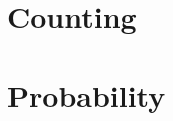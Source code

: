\documentclass{mcs}
\begin{document}
\part{Counting}




\part{Probability}





\iffalse

 (chernoff) %

equivalence relation section in binary relations

\fi



\end{document}
